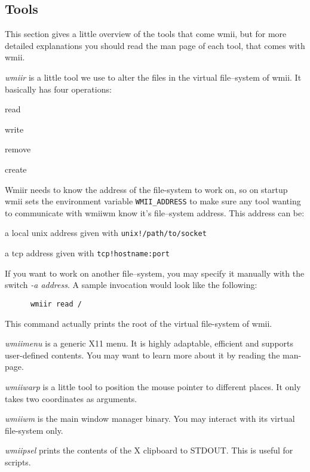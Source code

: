 \documentclass[12pt,a4paper]{article} %
\newenvironment{itemize*}
  {\begin{itemize}
      \setlength{\itemsep}{0pt}
      \setlength{\parskip}{0pt}}
  {\end{itemize}}
\begin{document}
  \subsection{Tools}

    This section gives a little overview of the tools that come wmii,
    but for more detailed explanations you should read the man page of
    each tool, that comes with wmii.
  
  \begin{description}
  
  \item
    \emph{wmiir} is a little tool we use to alter the files in the
    virtual file--system of wmii. It basically has four operations:

    \begin{itemize*}
    \item read
    \item write
    \item remove
    \item create
    \end{itemize*}

    Wmiir needs to know the address of the file-system to work
    on, so on startup wmii sets the environment variable 
    \verb+WMII_ADDRESS+ to make sure any tool wanting to
    communicate with wmiiwm know it's file--system address.
    This address can be:
    \begin{itemize*}
      \item a  local unix address given with \verb+unix!/path/to/socket+ 
      \item a tcp address given with \verb+tcp!hostname:port+ 
    \end{itemize*}
    
    If you want to work on another file--system, you may specify it
    manually with the switch \emph{-a  address}. A sample invocation
    would look like the following:
    \begin{verbatim}
      wmiir read /
    \end{verbatim}
    This command actually prints the root of the virtual file-system
    of wmii.

  \item
    \emph{wmiimenu} is a generic X11 menu. It is highly adaptable,
    efficient and supports user-defined contents. You may want to
    learn more about it by reading the man-page.

  \item
    \emph{wmiiwarp} is a little tool to position the mouse pointer to
    different places. It only takes two coordinates as arguments.

  \item
    \emph{wmiiwm} is the main window manager binary. You may interact
    with its virtual file-system only.

  \item
    \emph{wmiipsel} prints the contents of the X clipboard to
    STDOUT. This is useful for scripts.

  \end{description}
\end{document}
